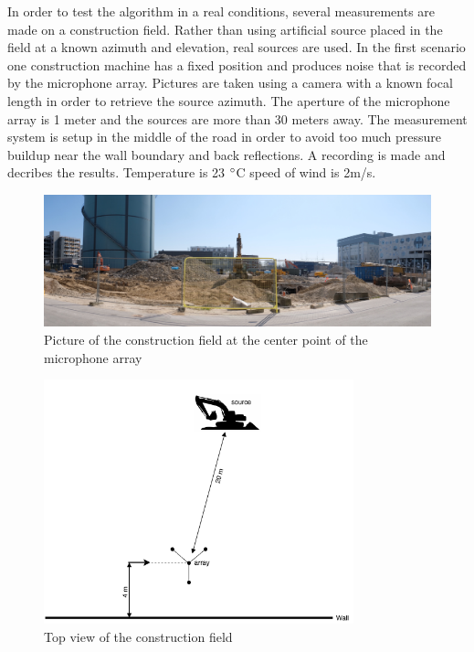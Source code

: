 In order to test the algorithm in a real conditions, several measurements are made on a construction field. Rather than using artificial source placed in the field at a known azimuth and elevation, real sources are used. In the first scenario one construction machine has a fixed position and produces noise that is recorded by the microphone array. Pictures are taken using a camera with a known focal length in order to retrieve the source azimuth. The aperture of the microphone array is 1 meter and the sources are more than 30 meters away. The measurement system is setup in the middle of the road in order to avoid too much pressure buildup near the wall boundary and back reflections. A recording is made and  decribes the results. Temperature is 23 $\degree$C speed of wind is 2m/s.



 
\begin{figure}[H]
    \centering
    \includegraphics[width=1\textwidth]{Figures/Scenario1pic.jpg}
    \caption{Picture of the construction field at the center point of the microphone array}
    \label{fig:Scenario1pic}
\end{figure}

\begin{figure}[H]
    \centering
    \includegraphics[width=0.8\textwidth]{Figures/scenario2diagram.png}
    \caption{Top view of the construction field}
    \label{fig:Scenario2}
\end{figure}

